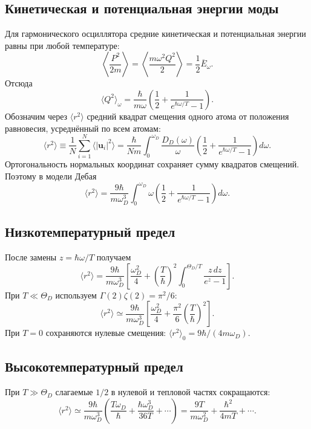 \documentclass[../final.tex]{subfiles}
\begin{document}
\subsection{Кинетическая и потенциальная энергии моды}
Для гармонического осциллятора средние кинетическая и потенциальная энергии
равны при любой температуре:
\begin{equation*}
 \left\langle\frac{P^2}{2m}\right\rangle
 =\left\langle\frac{m\omega^2Q^2}{2}\right\rangle
 =\frac12\overline E_\omega.
\end{equation*}
Отсюда
\begin{equation*}
 \langle Q^2\rangle_\omega
 =\frac{\hbar}{m\omega}\left(\frac12+\frac1{e^{\hbar\omega/T}-1}\right).
\end{equation*}
Обозначим через $\langle r^2\rangle$ средний квадрат смещения одного атома
от положения равновесия, усреднённый по всем атомам:
\begin{equation*}
 \langle r^2\rangle\equiv\frac1N\sum_{i=1}^N\langle|\mathbf u_i|^2\rangle
 =\frac{\hbar}{Nm}\int_0^{\omega_D}\frac{D_D(\omega)}{\omega}
 \left(\frac12+\frac1{e^{\hbar\omega/T}-1}\right)d\omega.
\end{equation*}
Ортогональность нормальных координат сохраняет сумму квадратов смещений.
Поэтому в модели Дебая
\begin{equation*}
 \langle r^2\rangle=\frac{9\hbar}{m\omega_D^3}
 \int_0^{\omega_D}\omega\left(\frac12+\frac1{e^{\hbar\omega/T}-1}\right)d\omega.
\end{equation*}

\subsection{Низкотемпературный предел}
После замены $z=\hbar\omega/T$ получаем
\begin{equation*}
 \langle r^2\rangle=\frac{9\hbar}{m\omega_D^3}
 \left[\frac{\omega_D^2}{4}
 +\left(\frac{T}{\hbar}\right)^2
 \int_0^{\Theta_D/T}\frac{z\,dz}{e^z-1}\right].
\end{equation*}
При $T\ll\Theta_D$ используем $\Gamma(2)\zeta(2)=\pi^2/6$:
\begin{equation*}
 \langle r^2\rangle\simeq\frac{9\hbar}{m\omega_D^3}
 \left[\frac{\omega_D^2}{4}+\frac{\pi^2}{6}\left(\frac{T}{\hbar}\right)^2\right].
\end{equation*}
При $T=0$ сохраняются нулевые смещения:
$\langle r^2\rangle_0=9\hbar/(4m\omega_D)$.

\subsection{Высокотемпературный предел}
При $T\gg\Theta_D$ слагаемые $1/2$ в нулевой и тепловой частях сокращаются:
\begin{equation*}
 \langle r^2\rangle\simeq\frac{9\hbar}{m\omega_D^3}
 \left(\frac{T\omega_D}{\hbar}+\frac{\hbar\omega_D^3}{36T}+\cdots\right)
 =\frac{9T}{m\omega_D^2}+\frac{\hbar^2}{4mT}+\cdots.
\end{equation*}
\end{document}

